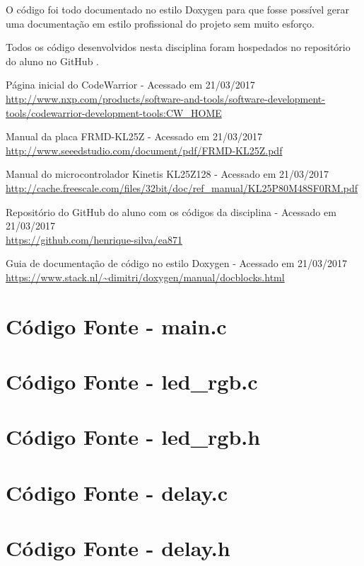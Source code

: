 \documentclass{article}
\begin{document}
O código foi todo documentado no estilo Doxygen \cite{doxygen} para que fosse possível gerar uma documentação em estilo profissional do projeto sem muito esforço.

Todos os código desenvolvidos nesta disciplina foram hospedados no repositório do aluno no GitHub \cite{github}.

\begin{thebibliography}{9} %

  Página inicial do CodeWarrior - Acessado em 21/03/2017\\
  \url{http://www.nxp.com/products/software-and-tools/software-development-tools/codewarrior-development-tools:CW_HOME}

  Manual da placa FRMD-KL25Z - Acessado em 21/03/2017\\
  \url{http://www.seeedstudio.com/document/pdf/FRMD-KL25Z.pdf}

  Manual do microcontrolador Kinetis KL25Z128 - Acessado em 21/03/2017\\
  \url{http://cache.freescale.com/files/32bit/doc/ref_manual/KL25P80M48SF0RM.pdf}

  Repositório do GitHub do aluno com os códigos da disciplina - Acessado em 21/03/2017\\
  \url{https://github.com/henrique-silva/ea871}

  Guia de documentação de código no estilo Doxygen - Acessado em 21/03/2017\\
  \url{https://www.stack.nl/~dimitri/doxygen/manual/docblocks.html}

\end{thebibliography}

\clearpage
\appendix
\section{Código Fonte - main.c}


\clearpage
\section{Código Fonte - led\_rgb.c}


\clearpage
\section{Código Fonte - led\_rgb.h}


\clearpage
\section{Código Fonte - delay.c}


\clearpage
\section{Código Fonte - delay.h}

\end{document}
